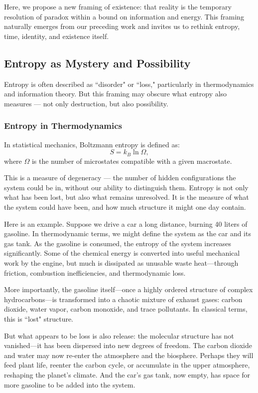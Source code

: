\documentclass[12pt]{article}
\begin{document}
Here, we propose a new framing of existence: that reality is the temporary resolution of paradox within a bound on information and energy. This framing naturally emerges from our preceding work and invites us to rethink entropy, time, identity, and existence itself.

\subsection{Entropy as Mystery and Possibility}

Entropy is often described as ``disorder" or ``loss," particularly in thermodynamics and information theory. But this framing may obscure what entropy also measures — not only destruction, but also possibility.

\subsubsection{Entropy in Thermodynamics}

In statistical mechanics, Boltzmann entropy is defined as:
\[
S = k_B \ln \Omega,
\]
where \( \Omega \) is the number of microstates compatible with a given macrostate.

This is a measure of degeneracy — the number of hidden configurations the system could be in, without our ability to distinguish them. Entropy is not only what has been lost, but also what remains unresolved. It is the measure of what the system could have been, and how much structure it might one day contain.

Here is an example. Suppose we drive a car a long distance, burning 40 liters of gasoline. In thermodynamic terms, we might define the system as the car and its gas tank. As the gasoline is consumed, the entropy of the system increases significantly. Some of the chemical energy is converted into useful mechanical work by the engine, but much is dissipated as unusable waste heat—through friction, combustion inefficiencies, and thermodynamic loss.

More importantly, the gasoline itself—once a highly ordered structure of complex hydrocarbons—is transformed into a chaotic mixture of exhaust gases: carbon dioxide, water vapor, carbon monoxide, and trace pollutants. In classical terms, this is ``lost" structure.

But what appears to be loss is also release: the molecular structure has not vanished—it has been dispersed into new degrees of freedom. The carbon dioxide and water may now re-enter the atmosphere and the biosphere. Perhaps they will feed plant life, reenter the carbon cycle, or accumulate in the upper atmosphere, reshaping the planet's climate. And the car's gas tank, now empty, has space for more gasoline to be added into the system.
\end{document}
